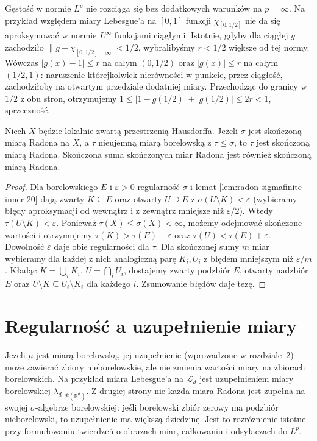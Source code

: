 \begin{uwaga}
Gęstość w normie $L^p$ nie rozciąga się bez dodatkowych
warunków na $p=\infty$. Na przykład względem miary
Lebesgue'a na $[0,1]$ funkcji $\chi_{[0,1/2]}$
nie da się aproksymować w normie $L^\infty$
funkcjami ciągłymi. Istotnie, gdyby dla ciągłej $g$
zachodziło $\|g-\chi_{[0,1/2]}\|_\infty<1/2$, wybralibyśmy
$r<1/2$ większe od tej normy. Wówczas $|g(x)-1|\le r$
na całym $(0,1/2)$ oraz $|g(x)|\le r$ na całym $(1/2,1)$:
naruszenie którejkolwiek nierówności w punkcie, przez ciągłość,
zachodziłoby na otwartym przedziale dodatniej miary.
Przechodząc do granicy w $1/2$ z obu stron, otrzymujemy
$1\le|1-g(1/2)|+|g(1/2)|\le2r<1$, sprzeczność.
\end{uwaga}

\begin{lemat}
\label{it:lem:radon-dominated}
Niech $X$ będzie lokalnie zwartą przestrzenią Hausdorffa.
Jeżeli $\sigma$ jest skończoną miarą Radona na $X$,
a $\tau$ nieujemną miarą borelowską z $\tau\le\sigma$,
to $\tau$ jest skończoną miarą Radona.
Skończona suma skończonych miar Radona jest również
skończoną miarą Radona.
\end{lemat}
\begin{proof}
Dla borelowskiego $E$ i $\varepsilon>0$ regularność
$\sigma$ i lemat \ref{lem:radon-sigmafinite-inner-20}
dają zwarty $K\subseteq E$ oraz otwarty $U\supseteq E$
z $\sigma(U\setminus K)<\varepsilon$ (wybieramy
błędy aproksymacji od wewnątrz i z zewnątrz
mniejsze niż $\varepsilon/2$). Wtedy
$\tau(U\setminus K)<\varepsilon$. Ponieważ
$\tau(X)\le\sigma(X)<\infty$, możemy odejmować
skończone wartości i otrzymujemy
$\tau(K)>\tau(E)-\varepsilon$ oraz
$\tau(U)<\tau(E)+\varepsilon$. Dowolność
$\varepsilon$ daje obie regularności dla $\tau$. Dla skończonej sumy $m$ miar wybieramy
dla każdej z nich analogiczną parę $K_i,U_i$ z
błędem mniejszym niż $\varepsilon/m$. Kładąc
$K=\bigcup_iK_i$, $U=\bigcap_iU_i$, dostajemy
zwarty podzbiór $E$, otwarty nadzbiór $E$ oraz
$U\setminus K\subseteq U_i\setminus K_i$ dla każdego $i$.
Zsumowanie błędów daje tezę.
\end{proof}

\section{Regularność a uzupełnienie miary}
Jeżeli $\mu$ jest miarą borelowską, jej uzupełnienie
(wprowadzone w rozdziale~2) może zawierać zbiory
nieborelowskie, ale nie zmienia wartości miary
na zbiorach borelowskich. Na przykład miara Lebesgue'a
na $\mathcal L_d$ jest uzupełnieniem miary borelowskiej
$\lambda_d|_{\mathcal B(\mathbb R^d)}$. Z drugiej strony
nie każda miara Radona jest zupełna na swojej
$\sigma$-algebrze borelowskiej: jeśli borelowski zbiór
zerowy ma podzbiór nieborelowski, to uzupełnienie
ma większą dziedzinę. Jest to rozróżnienie
istotne przy formułowaniu twierdzeń o obrazach miar,
całkowaniu i odsyłaczach do $L^p$.

